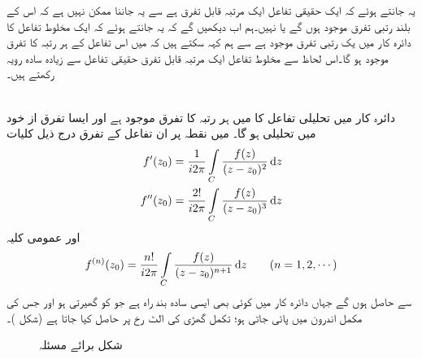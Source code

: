 یہ جانتے ہوئے کہ ایک حقیقی تفاعل ایک مرتبہ قابل تفرق ہے سے یہ جاننا ممکن نہیں ہے کہ  اس کے بلند رتبی تفرق موجود ہوں گے یا نہیں۔ہم اب دیکھیں گے کہ یہ جانتے ہوئے کہ ایک مخلوط تفاعل کا دائرہ کار  میں  یک رتبی تفرق موجود ہے سے ہم کہہ سکتے ہیں کہ  میں اس تفاعل کے ہر رتبہ کا تفرق موجود ہو گا۔اس لحاظ سے مخلوط تفاعل ایک مرتبہ قابل تفرق حقیقی تفاعل سے زیادہ سادہ رویہ رکھتے ہیں۔

\quad {}\\
دائرہ کار  میں تحلیلی تفاعل  کا  میں ہر رتبہ کا تفرق موجود ہے اور ایسا تفرق از خود  میں تحلیلی ہو گا۔  میں نقطہ  پر ان تفاعل کے تفرق درج ذیل کلیات
\begin{align}
f'(z_0)&=\frac{1}{i2\pi}\int\limits_C \frac{f(z)}{(z-z_0)^2}\dif z\label{مساوات_مخلوط_تکمل_تحلیلی_تفاعل_تفرق_الف}\\
f''(z_0)&=\frac{2!}{i2\pi}\int\limits_C \frac{f(z)}{(z-z_0)^3}\dif z\label{مساوات_مخلوط_تکمل_تحلیلی_تفاعل_تفرق_ب}
\end{align}
اور عمومی کلیہ
\begin{align}\label{مساوات_مخلوط_تکمل_تحلیلی_تفاعل_کے_تفرق}
f^{(n)}(z_0)=\frac{n!}{i2\pi}\int\limits_C \frac{f(z)}{(z-z_0)^{n+1}}\dif z\quad \quad (n=1,2,\cdots)
\end{align}
سے حاصل ہوں گے جہاں  دائرہ کار  میں  کوئی بھی ایسی سادہ بند راہ ہے جو  کو گھیرتی ہو اور جس کی مکمل اندرون  میں پائی جاتی ہو؛ تکمل گھڑی کی الٹ رخ  پر حاصل کیا جاتا ہے (شکل )۔ 
\begin{figure}
\centering
{}
\caption{شکل برائے مسئلہ }
\label{شکل_مسئلہ_مخلوط_تکمل_تحلیلی_تفاعل_کے_تفرق}
\end{figure}

